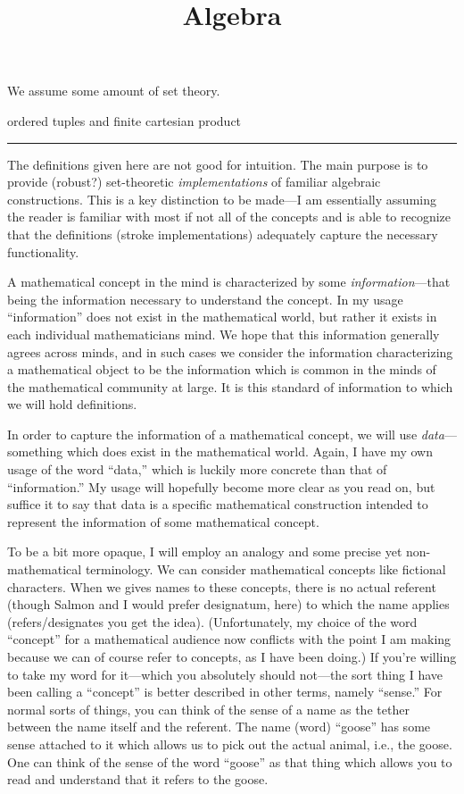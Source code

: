 \documentclass[12pt]{article}
\title{Algebra \\
    \large 
}
\author{}
\date{}
\newcommand{\sepline}{\rule{\textwidth}{0.4pt}}
\theoremstyle{definition}
\newcommand{\<}{\left\langle}
\renewcommand{\>}{\right\rangle}
\renewcommand{\_}[1]{{_{#1}}}
\begin{document}
We assume some amount of set theory.

ordered tuples and finite cartesian product

\sepline

The definitions given here are not good for intuition.
The main purpose is to provide (robust?) set-theoretic \emph{implementations} of familiar algebraic constructions.
This is a key distinction to be made---I am essentially assuming the reader is familiar with most if not all of the concepts and is able to recognize that the definitions (stroke implementations) adequately capture the necessary functionality.

A mathematical concept in the mind is characterized by some \emph{information}---that being the information necessary to understand the concept.
In my usage ``information'' does not exist in the mathematical world, but rather it exists in each individual mathematicians mind.
We hope that this information generally agrees across minds, and in such cases we consider the information characterizing a mathematical object to be the information which is common in the minds of the mathematical community at large.
It is this standard of information to which we will hold definitions.

In order to capture the information of a mathematical concept, we will use \emph{data}---something which does exist in the mathematical world.
Again, I have my own usage of the word ``data,'' which is luckily more concrete than that of ``information.''
My usage will hopefully become more clear as you read on, but suffice it to say that data is a specific mathematical construction intended to represent the information of some mathematical concept.

To be a bit more opaque, I will employ an analogy and some precise yet non-mathematical terminology.
We can consider mathematical concepts like fictional characters.
When we gives names to these concepts, there is no actual referent (though Salmon and I would prefer designatum, here) to which the name applies (refers/designates you get the idea).
(Unfortunately, my choice of the word ``concept'' for a mathematical audience now conflicts with the point I am making because we can of course refer to concepts, as I have been doing.)
If you're willing to take my word for it---which you absolutely should not---the sort thing I have been calling a ``concept'' is better described in other terms, namely ``sense.''
For normal sorts of things, you can think of the sense of a name as the tether between the name itself and the referent.
The name (word) ``goose'' has some sense attached to it which allows us to pick out the actual animal, i.e., the goose.
One can think of the sense of the word ``goose'' as that thing which allows you to read and understand that it refers to the goose.
\end{document}
